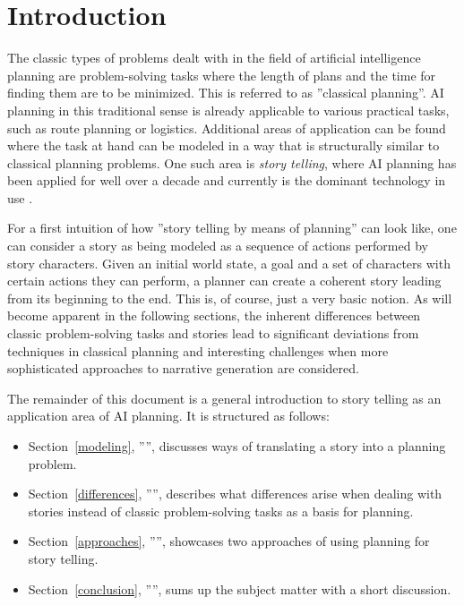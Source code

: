 \section{Introduction}
The classic types of problems dealt with in the field of artificial intelligence planning are problem-solving tasks where the length of plans and the time for finding them are to be minimized. This is referred to as ''classical planning''. AI planning in this traditional sense is already applicable to various practical tasks, such as route planning or logistics. Additional areas of application can be found where the task at hand can be modeled in a way that is structurally similar to classical planning problems. One such area is \emph{story telling}, where AI planning has been applied for well over a decade and currently is the dominant technology in use \cite{Porteous10}.

For a first intuition of how ''story telling by means of planning'' can look like, one can consider a story as being modeled as a sequence of actions performed by story characters. Given an initial world state, a goal and a set of characters with certain actions they can perform, a planner can create a coherent story leading from its beginning to the end. This is, of course, just a very basic notion. As will become apparent in the following sections, the inherent differences between classic problem-solving tasks and stories lead to significant deviations from techniques in classical planning and interesting challenges when more sophisticated approaches to narrative generation are considered.

The remainder of this document is a general introduction to story telling as an application area of AI planning. It is structured as follows:
\begin{itemize}
\item Section~\ref{modeling}, '''', discusses ways of translating a story into a planning problem.
\item Section~\ref{differences}, '''', describes what differences arise when dealing with stories instead of classic problem-solving tasks as a basis for planning.
\item Section~\ref{approaches}, '''', showcases two approaches of using planning for story telling.
\item Section~\ref{conclusion}, '''', sums up the subject matter with a short discussion.
\end{itemize}
